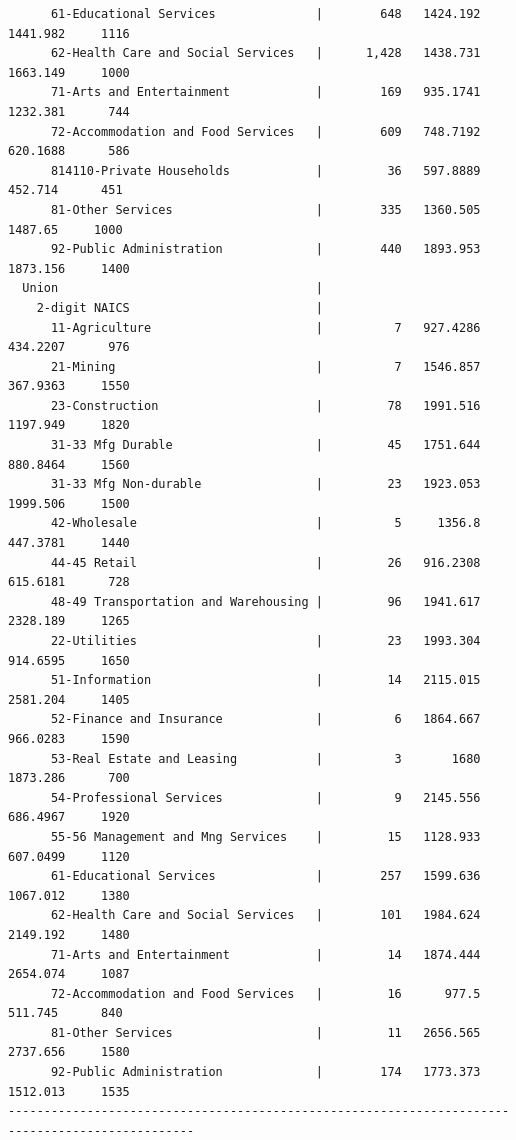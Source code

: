 \documentclass[
]{book}
\begin{document}
\begin{verbatim}
      61-Educational Services              |        648   1424.192             1441.982     1116
      62-Health Care and Social Services   |      1,428   1438.731             1663.149     1000
      71-Arts and Entertainment            |        169   935.1741             1232.381      744
      72-Accommodation and Food Services   |        609   748.7192             620.1688      586
      814110-Private Households            |         36   597.8889              452.714      451
      81-Other Services                    |        335   1360.505              1487.65     1000
      92-Public Administration             |        440   1893.953             1873.156     1400
  Union                                    |                                                    
    2-digit NAICS                          |                                                    
      11-Agriculture                       |          7   927.4286             434.2207      976
      21-Mining                            |          7   1546.857             367.9363     1550
      23-Construction                      |         78   1991.516             1197.949     1820
      31-33 Mfg Durable                    |         45   1751.644             880.8464     1560
      31-33 Mfg Non-durable                |         23   1923.053             1999.506     1500
      42-Wholesale                         |          5     1356.8             447.3781     1440
      44-45 Retail                         |         26   916.2308             615.6181      728
      48-49 Transportation and Warehousing |         96   1941.617             2328.189     1265
      22-Utilities                         |         23   1993.304             914.6595     1650
      51-Information                       |         14   2115.015             2581.204     1405
      52-Finance and Insurance             |          6   1864.667             966.0283     1590
      53-Real Estate and Leasing           |          3       1680             1873.286      700
      54-Professional Services             |          9   2145.556             686.4967     1920
      55-56 Management and Mng Services    |         15   1128.933             607.0499     1120
      61-Educational Services              |        257   1599.636             1067.012     1380
      62-Health Care and Social Services   |        101   1984.624             2149.192     1480
      71-Arts and Entertainment            |         14   1874.444             2654.074     1087
      72-Accommodation and Food Services   |         16      977.5              511.745      840
      81-Other Services                    |         11   2656.565             2737.656     1580
      92-Public Administration             |        174   1773.373             1512.013     1535
------------------------------------------------------------------------------------------------
\end{verbatim}
\end{document}
